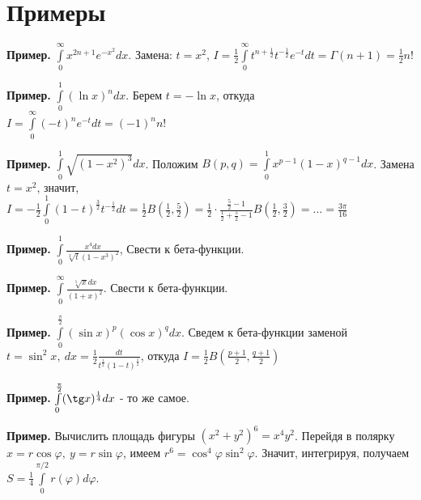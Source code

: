 \section{Примеры}
\textbf{Пример.} $\int\limits_{0}^{\infty} x^{2n+1}e^{-x^2}dx$. Замена:
$t=x^2$,  $I=\frac{1}{2}\int\limits_{0}^{\infty} t^{n+\frac{1}{2}}
t^{-\frac{1}{2}}e^{-t}dt=\Gamma(n+1)=\frac{1}{2}n!$ 

\textbf{Пример.} $\int\limits_{0}^{1} (\ln x)^ndx$. Берем $t=-\ln x$, откуда
$I=\int\limits_{0}^{\infty}(-t)^ne^{-t}dt=(-1)^nn!$

\textbf{Пример.} $\int\limits_{0}^{1}\sqrt{(1-x^2)^3}dx$. Положим
$B(p,q)=\int\limits_{0}^{1}x^{p-1}(1-x)^{q-1}dx$. Замена $t=x^2$, значит,
$I=-\frac{1}{2}\int\limits_{0}^{1}(1-t)^{\frac{3}{2}}t^{-\frac{1}{2}}dt=
\frac{1}{2}B(\frac{1}{2},\frac{5}{2})=\frac{1}{2}\cdot \frac{\frac{5}{2}-1}
{\frac{1}{2}+\frac{5}{2}-1}B(\frac{1}{2},\frac{3}{2})=...=
\frac{3\pi}{16}$ 

\textbf{Пример.} $\int\limits_{0}^{1} \frac{x^4dx}{\sqrt[3]t{(1-x^3)^2}}$,
Свести к бета-функции.

\textbf{Пример.} $\int\limits_{0}^{\infty}\frac{\sqrt[5]{x}dx}{(1+x)^2}$. 
Свести к бета-функции.

\textbf{Пример.} $\int\limits_{0}^{\frac{\pi}{2}}(\sin x)^p(\cos x)^qdx$.
Сведем к бета-функции заменой $t=\sin^2x,~dx=\frac{1}{2}\frac{dt}{
t^\frac{1}{2}(1-t)^\frac{1}{2}}$, откуда
$I=\frac{1}{2}B(\frac{p+1}{2},\frac{q+1}{2})$ 

\textbf{Пример.} $\int\limits_{0}^{\frac{\pi}{2}}(\tg x)^{\frac{1}{4}}dx$ - 
то же самое.

\textbf{Пример.} Вычислить площадь фигуры
$(x^2+y^2)^6=x^4y^2$. Перейдя в полярку  $x=r\cos\varphi,~y=r\sin\varphi$,
имеем $r^6=\cos^4\varphi\sin^2\varphi$.  Значит, интегрируя, 
получаем $S=\frac{1}{4}\int\limits_{0}^{\pi/2}r(\varphi)d\varphi$. 

















